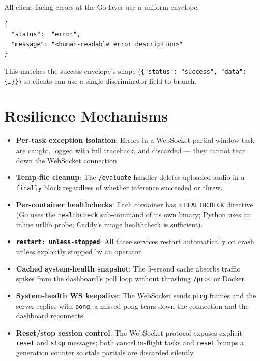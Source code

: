 All client-facing errors at the Go layer use a uniform envelope:

\begin{lstlisting}[caption={Uniform error response}]
{
  "status":  "error",
  "message": "<human-readable error description>"
}
\end{lstlisting}

This matches the success envelope's shape (\texttt{\{"status": "success", "data": \{\dots\}\}}) so clients can use a single discriminator field to branch.

\section{Resilience Mechanisms}

\begin{emeraldbox}[title=Implemented Resilience Patterns]
\begin{itemize}
  \item \textbf{Per-task exception isolation}: Errors in a WebSocket partial-window task are caught, logged with full traceback, and discarded --- they cannot tear down the WebSocket connection.
  \item \textbf{Temp-file cleanup}: The \texttt{/evaluate} handler deletes uploaded audio in a \texttt{finally} block regardless of whether inference succeeded or threw.
  \item \textbf{Per-container healthchecks}: Each container has a \texttt{HEALTHCHECK} directive (Go uses the \texttt{healthcheck} sub-command of its own binary; Python uses an inline urllib probe; Caddy's image healthcheck is sufficient).
  \item \textbf{\texttt{restart: unless-stopped}}: All three services restart automatically on crash unless explicitly stopped by an operator.
  \item \textbf{Cached system-health snapshot}: The 5-second cache absorbs traffic spikes from the dashboard's poll loop without thrashing \texttt{/proc} or Docker.
  \item \textbf{System-health WS keepalive}: The WebSocket sends \texttt{ping} frames and the server replies with \texttt{pong}; a missed pong tears down the connection and the dashboard reconnects.
  \item \textbf{Reset/stop session control}: The WebSocket protocol exposes explicit \texttt{reset} and \texttt{stop} messages; both cancel in-flight tasks and \texttt{reset} bumps a generation counter so stale partials are discarded silently.
\end{itemize}
\end{emeraldbox}

